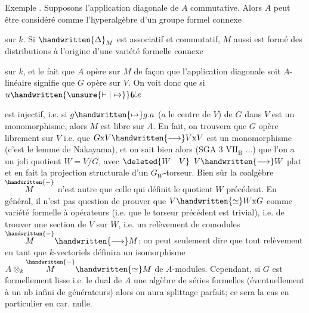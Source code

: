 Exemple . Supposons l'application diagonale de $A$ commutative. Alors $A$ peut être considéré comme l'hyperalgèbre d'un groupe formel connexe  sur $k$. Si $\handwritten{\Delta}_{M}$ est associatif et commutatif, $M$ aussi est formé des distributions à l'origine d'une variété formelle connexe  sur $k$, et le fait que $A$ opère sur $M$ de façon que l'application diagonale soit $A$-linéaire signifie que $G$ opère sur $V$. On voit donc que si $u\handwritten{\unsure{\vdash|\mapsto}}\rlap{\(U\)}u.e$  est injectif, i.e. si $g\handwritten{\mapsto}g.a$ ($a$ le centre de $V$) de $G$ dans $V$ est un monomorphisme, alors $M$ est libre sur $A$. En fait, on trouvera que $G$ opère librement sur $V$ i.e.
que $G\mathrm{x}V\handwritten{\longrightarrow}V\mathrm{x}V$ est un monomorphisme (c'est le lemme de Nakayama), et on sait bien alors (SGA 3 $\mathrm{VII}_{\mathrm{B}}$ ...) que  l'on a un joli quotient $W=V/G$, avec $\deleted{W\quad V}$ $V\handwritten{\longrightarrow}W$ plat et en fait la projection structurale d'un $G_{W}$-torseur. Bien sûr la coalgèbre $\overset{\handwritten{-}}{M}$ n'est autre que celle qui définit le quotient $W$ précédent. En général, il n'est pas question de prouver que $V\handwritten{\simeq}W\mathrm{x}G$ comme variété formelle à opérateurs (i.e. que le torseur précédent est trivial), i.e. de trouver une section de $V$ sur $W$, i.e. un relèvement de comodules $\overset{\handwritten{-}}{M}\handwritten{\longrightarrow}M$; on peut seulement dire que tout relèvement en tant que $k$-vectoriels définira un isomorphisme $A\otimes_{k}\overset{\handwritten{-}}{M}\handwritten{\simeq}M$ de $A$-modules. Cependant, si $G$ est formellement lisse i.e. le dual de $A$ une algèbre de séries formelles (éventuellement à un nb infini de générateurs) alors on aura splittage parfait; ce sera la cas en particulier en car. nulle.


